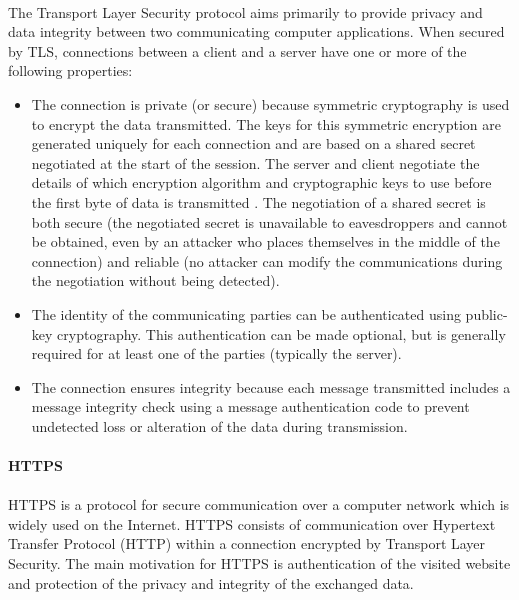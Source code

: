 \paragraph{}
The Transport Layer Security protocol aims primarily to provide privacy and data integrity between two communicating computer applications. When secured by TLS, connections between a client  and a server have one or more of the following properties:
\begin{itemize}
\item The connection is private (or secure) because symmetric cryptography is used to encrypt the data transmitted. The keys for this symmetric encryption are generated uniquely for each connection and are based on a shared secret negotiated at the start of the session. The server and client negotiate the details of which encryption algorithm and cryptographic keys to use before the first byte of data is transmitted . The negotiation of a shared secret is both secure (the negotiated secret is unavailable to eavesdroppers and cannot be obtained, even by an attacker who places themselves in the middle of the connection) and reliable (no attacker can modify the communications during the negotiation without being detected).
\item The identity of the communicating parties can be authenticated using public-key cryptography. This authentication can be made optional, but is generally required for at least one of the parties (typically the server).
\item The connection ensures integrity because each message transmitted includes a message integrity check using a message authentication code to prevent undetected loss or alteration of the data during transmission.
\end{itemize}

\paragraph{}\textbf{HTTPS}
\paragraph{}
HTTPS is a protocol for secure communication over a computer network which is widely used on the Internet. HTTPS consists of communication over Hypertext Transfer Protocol (HTTP) within a connection encrypted by Transport Layer Security. The main motivation for HTTPS is authentication of the visited website and protection of the privacy and integrity of the exchanged data.

